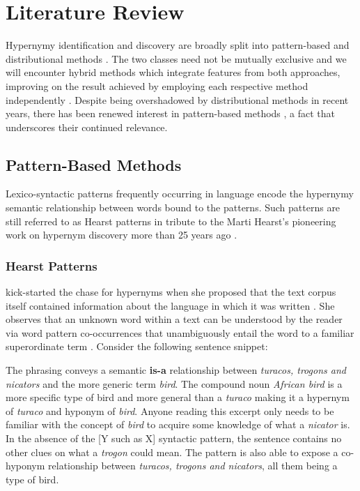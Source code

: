 \chapter{Literature Review}
Hypernymy identification and discovery are broadly split into pattern-based and distributional methods \citep{camacho2018semeval, Wang2017}.  The two classes need not be mutually exclusive and we will encounter hybrid methods which integrate features from both approaches, improving on the result achieved by employing each respective method independently  \citep{shwartz2016path, bernier2018crim}.  Despite being overshadowed by distributional methods in recent years, there has been renewed interest in pattern-based methods \citep{roller2018hearst}, a fact that underscores their continued relevance.

\section{Pattern-Based Methods} \label{Pattern-Based Methods}
Lexico-syntactic patterns frequently occurring in language encode the hypernymy semantic relationship between words bound to the patterns.  Such patterns are still referred to as Hearst patterns in tribute to the Marti Hearst's pioneering work on hypernym discovery more than 25 years ago \citep{hearst1992automatic}.

\subsection{Hearst Patterns} \label{Hearst Patterns}
\citeauthor{hearst1992automatic} kick-started the chase for hypernyms when she proposed that the text corpus itself contained information about the language in which it was written \citep{hearst1992automatic}.  She observes that an unknown word within a text can be understood by the reader via word pattern co-occurrences that unambiguously entail the word to a familiar superordinate term \citep{hearst1992automatic}.  Consider the following sentence snippet:


The phrasing conveys a semantic \textbf{is-a} relationship between \textit{turacos, trogons and nicators} and the more generic term \textit{bird}.  The compound noun \textit{African bird} is a more specific type of bird and more general than a \textit{turaco} making it a hypernym of \textit{turaco} and hyponym of \textit{bird}.  Anyone reading this excerpt only needs to be familiar with the concept of \textit{bird} to acquire some knowledge of what a \textit{nicator} is.  In the absence of the [Y such as X] syntactic pattern, the sentence contains no other clues on what a \textit{trogon} could mean.  The pattern is also able to expose a co-hyponym relationship between \textit{turacos, trogons and nicators}, all them being a type of bird.  

